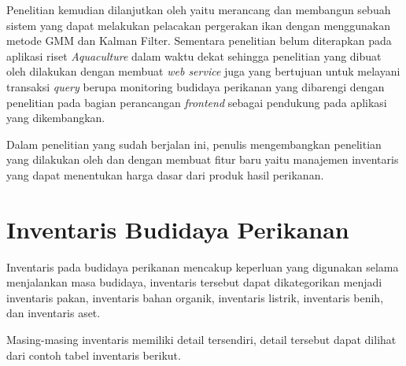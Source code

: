 Penelitian \citep{bagus2022} kemudian dilanjutkan oleh \citep{hafiz2021} yaitu merancang dan membangun sebuah sistem yang dapat melakukan pelacakan pergerakan ikan dengan menggunakan metode GMM dan Kalman Filter. Sementara penelitian \citep{fadhil2021} belum diterapkan pada aplikasi riset \textit{Aquaculture} dalam waktu dekat sehingga penelitian yang dibuat oleh \citep{andri2022} dilakukan dengan membuat \textit{web service} juga yang bertujuan untuk melayani transaksi \textit{query} berupa monitoring budidaya perikanan yang dibarengi dengan penelitian \citep{gian2022} pada bagian perancangan \textit{frontend} sebagai pendukung pada aplikasi yang dikembangkan.

Dalam penelitian yang sudah berjalan ini, penulis mengembangkan penelitian yang dilakukan oleh \citep{andri2022} dan \citep{gian2022} dengan membuat fitur baru yaitu manajemen inventaris yang dapat menentukan harga dasar dari produk hasil perikanan.

\section{Inventaris Budidaya Perikanan}

Inventaris pada budidaya perikanan mencakup keperluan yang digunakan selama menjalankan masa budidaya, inventaris tersebut dapat dikategorikan menjadi inventaris pakan, inventaris bahan organik, inventaris listrik, inventaris benih, dan inventaris aset.

Masing-masing inventaris memiliki detail tersendiri, detail tersebut dapat dilihat dari contoh tabel inventaris berikut.

